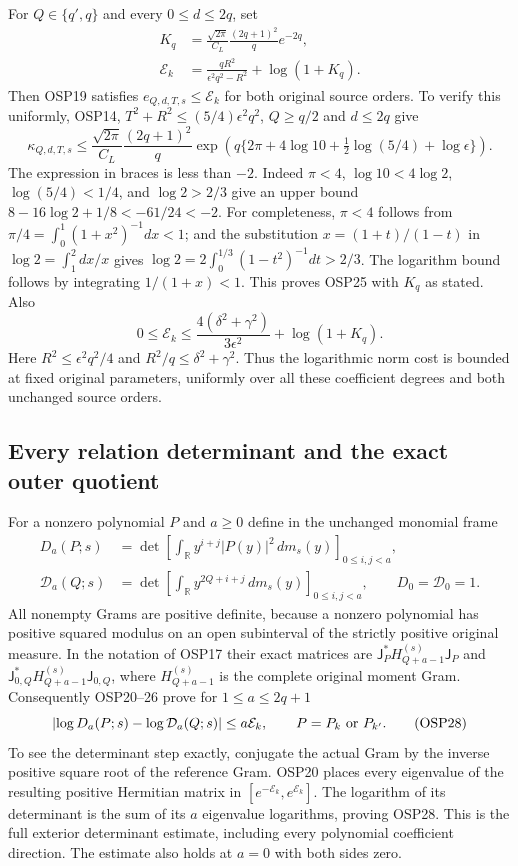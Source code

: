 \documentclass[11pt,a4paper]{article}
\begin{document}
For $Q\in\{q',q\}$ and every $0\le d\le2q$, set
\[
\begin{split}
K_q&=\frac{\sqrt{2\pi}}{C_L}\frac{(2q+1)^2}{q}e^{-2q},\\
\mathcal E_k&=\frac{qR^2}{\epsilon^2q^2-R^2}+\log(1+K_q).
\end{split}\tag{OSP24}
\]
Then OSP19 satisfies $e_{Q,d,T,s}\le\mathcal E_k$ for both
original source orders. To verify this uniformly, OSP14,
$T^2+R^2\le(5/4)\epsilon^2q^2$, $Q\ge q/2$ and $d\le2q$
give
\[
\kappa_{Q,d,T,s}
\le\frac{\sqrt{2\pi}}{C_L}\frac{(2q+1)^2}{q}
\exp\left(q\{2\pi+4\log10+\tfrac12\log(5/4)+\log\epsilon\}\right).
\tag{OSP25}
\]
The expression in braces is less than $-2$. Indeed
$\pi<4$, $\log10<4\log2$, $\log(5/4)<1/4$, and
$\log2>2/3$ give an upper bound
$8-16\log2+1/8<-61/24<-2$.
For completeness, $\pi<4$ follows from
$\pi/4=\int_0^1(1+x^2)^{-1}dx<1$; and the substitution
$x=(1+t)/(1-t)$ in $\log2=\int_1^2dx/x$ gives
$\log2=2\int_0^{1/3}(1-t^2)^{-1}dt>2/3$.
The logarithm bound follows by integrating $1/(1+x)<1$.
This proves OSP25 with $K_q$ as stated. Also
\[
0\le\mathcal E_k
\le \frac{4(\delta^2+\gamma^2)}{3\epsilon^2}+\log(1+K_q).
\tag{OSP26}
\]
Here $R^2\le\epsilon^2q^2/4$ and $R^2/q\le\delta^2+\gamma^2$.
Thus the logarithmic norm cost is bounded at fixed original
parameters, uniformly over all these coefficient degrees and both
unchanged source orders.

\subsection{Every relation determinant and the exact outer quotient}

For a nonzero polynomial $P$ and $a\ge0$ define in the unchanged monomial frame
\[
\begin{split}
D_a(P;s)&=\det\left[\int_{\mathbb R}y^{i+j}|P(y)|^2\,dm_s(y)
                                      \right]_{0\le i,j<a},\\
\mathcal D_a(Q;s)&=\det\left[\int_{\mathbb R}y^{2Q+i+j}\,dm_s(y)
                                      \right]_{0\le i,j<a},
\qquad D_0=\mathcal D_0=1 .
\end{split}\tag{OSP27}
\]
All nonempty Grams are positive definite, because a nonzero
polynomial has positive squared modulus on an open subinterval
of the strictly positive original measure. In the notation of
OSP17 their exact matrices are
$\mathsf J_P^*H^{(s)}_{Q+a-1}\mathsf J_P$ and
$\mathsf J_{0,Q}^*H^{(s)}_{Q+a-1}\mathsf J_{0,Q}$,
where $H^{(s)}_{Q+a-1}$ is the complete original moment Gram.
Consequently OSP20--26 prove for $1\le a\le2q+1$
\[
\left|\log D_a(P;s)-\log\mathcal D_a(Q;s)\right|
\le a\mathcal E_k,\qquad P=P_k\ \hbox{or}\ P_{k'} .
\tag{OSP28}
\]
To see the determinant step exactly, conjugate the actual Gram by
the inverse positive square root of the reference Gram. OSP20
places every eigenvalue of the resulting positive Hermitian
matrix in $[e^{-\mathcal E_k},e^{\mathcal E_k}]$. The logarithm
of its determinant is the sum of its $a$ eigenvalue logarithms,
proving OSP28. This is the full exterior determinant estimate,
including every polynomial coefficient direction. The estimate
also holds at $a=0$ with both sides zero.
\end{document}
